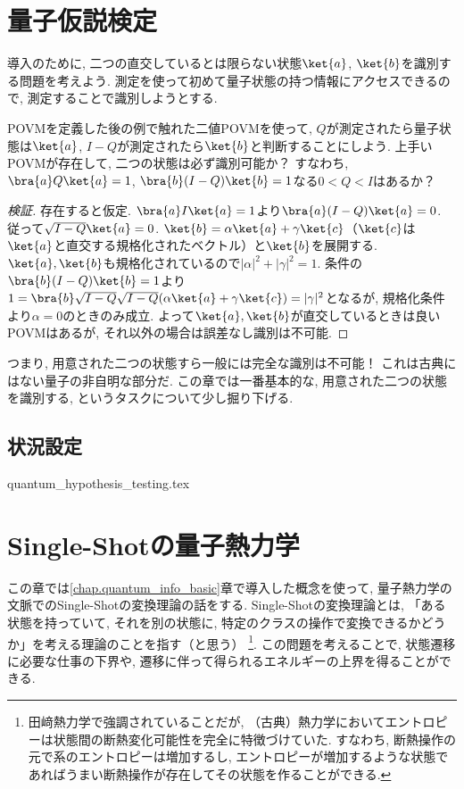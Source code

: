 \documentclass[report]{jlreq}
\begin{document}
\chapter{量子仮説検定}
導入のために, 二つの直交しているとは限らない状態$\ket{a}$, $\ket{b}$を識別する問題を考えよう. 
測定を使って初めて量子状態の持つ情報にアクセスできるので, 測定することで識別しようとする. 

\begin{tcolorbox}[colback=black!5!white,colframe=black!75!white]
    POVMを定義した後の例で触れた二値POVMを使って, $Q$が測定されたら量子状態は$\ket{a}$, $I-Q$が測定されたら$\ket{b}$と判断することにしよう.
    上手いPOVMが存在して, 二つの状態は必ず識別可能か？
    すなわち, $\bra{a}Q\ket{a}=1$, $\bra{b}(I-Q)\ket{b}=1$なる$0< Q < I$はあるか？
\end{tcolorbox}

\begin{proof}[検証]   
    存在すると仮定. 
    $\bra{a}I\ket{a}=1$より$\bra{a}(I-Q)\ket{a}=0$. 
    従って$\sqrt{I-Q}\ket{a}=0$. 
    $\ket{b}=\alpha\ket{a}+\gamma\ket{c}$（$\ket{c}$は$\ket{a}$と直交する規格化されたベクトル）と$\ket{b}$を展開する. 
    $\ket{a}, \ket{b}$も規格化されているので$|\alpha|^2+|\gamma|^2=1$. 
    条件の$\bra{b}(I-Q)\ket{b}=1$より$1=\bra{b}\sqrt{I-Q}\sqrt{I-Q}(\alpha\ket{a}+\gamma\ket{c})=|\gamma|^2$となるが, 規格化条件より$\alpha=0$のときのみ成立. 
    よって$\ket{a}, \ket{b}$が直交しているときは良いPOVMはあるが, それ以外の場合は誤差なし識別は不可能. 
\end{proof}

つまり, 用意された二つの状態すら一般には完全な識別は不可能！
これは古典にはない量子の非自明な部分だ. 
この章では一番基本的な, 用意された二つの状態を識別する, というタスクについて少し掘り下げる. 

\section{状況設定}
{quantum_hypothesis_testing.tex}

\chapter{Single-Shotの量子熱力学}
この章では\ref{chap.quantum_info_basic}章で導入した概念を使って, 量子熱力学の文脈でのSingle-Shotの変換理論の話をする. 
Single-Shotの変換理論とは, 「ある状態を持っていて, それを別の状態に, 特定のクラスの操作で変換できるかどうか」を考える理論のことを指す（と思う）
\footnote{田﨑熱力学で強調されていることだが, （古典）熱力学においてエントロピーは状態間の断熱変化可能性を完全に特徴づけていた. 
すなわち, 断熱操作の元で系のエントロピーは増加するし, エントロピーが増加するような状態であればうまい断熱操作が存在してその状態を作ることができる. }. 
この問題を考えることで, 状態遷移に必要な仕事の下界や, 遷移に伴って得られるエネルギーの上界を得ることができる. 
\end{document}

